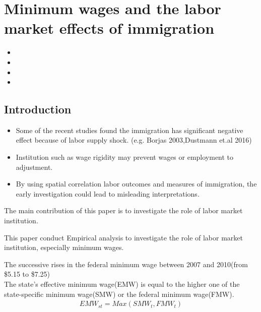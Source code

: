 \documentclass[../root]{subfiles}
\begin{document}
    \chapter{Minimum wages and the labor market effects of immigration}

    \begin{shortsummary}
        \begin{itemize}
            \item {}
            \item {}
            \item {}
            \item {}
        \end{itemize}
    \end{shortsummary}

    \section{Introduction}
    \begin{itemize}
        \item Some of the recent studies found the immigration has significant negative effect because of labor supply shock. (e.g. Borjas 2003,Dustmann et.al 2016)
        \item Institution such as wage rigidity may prevent wages or employment to adjustment. 
        \item By using spatial correlation labor outcomes and measures of immigration, the early investigation could lead to misleading interpretations. 
    \end{itemize}
    The main contribution of this paper is to investigate the role of labor market institution.

    This paper conduct Empirical analysis to investigate the role of labor market institution, especially minimum wages.
    
    The successive rises in the federal minimum wage between 2007 and 2010(from \$5.15 to \$7.25) \\
    The state's effective minimum wage(EMW) is equal to the higher one of the state-specific minimum wage(SMW) or the federal minimum wage(FMW).
    \begin{align*}
        EMW_{st}=Max(SMW_t, FMW_t)
    \end{align*}
\end{document}
